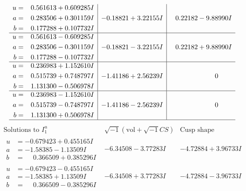 \documentclass[1p]{elsarticle_modified}
\theoremstyle{definition}
\newcommand{\I}{\sqrt{-1}}
\begin{document}
$$\begin{array}{c|c|c}
\begin{aligned}
u &= \phantom{-}0.561613 + 0.609285 I \\
a &= \phantom{-}0.283506 + 0.301159 I \\
b &= \phantom{-}0.177288 + 0.107732 I\end{aligned}
 & -0.18821 + 3.22155 I & \phantom{-}0.22182 - 9.88990 I \\ \hline\begin{aligned}
u &= \phantom{-}0.561613 - 0.609285 I \\
a &= \phantom{-}0.283506 - 0.301159 I \\
b &= \phantom{-}0.177288 - 0.107732 I\end{aligned}
 & -0.18821 - 3.22155 I & \phantom{-}0.22182 + 9.88990 I \\ \hline\begin{aligned}
u &= \phantom{-}0.236983 + 1.152610 I \\
a &= \phantom{-}0.515739 + 0.748797 I \\
b &= \phantom{-}1.131300 - 0.506978 I\end{aligned}
 & -1.41186 + 2.56239 I & \phantom{-0.000000 } 0 \\ \hline\begin{aligned}
u &= \phantom{-}0.236983 - 1.152610 I \\
a &= \phantom{-}0.515739 - 0.748797 I \\
b &= \phantom{-}1.131300 + 0.506978 I\end{aligned}
 & -1.41186 - 2.56239 I & \phantom{-0.000000 } 0\\
 \hline 
 \end{array}$$\newpage$$\begin{array}{c|c|c}  
\text{Solutions to }I^u_{1}& \I (\text{vol} + \sqrt{-1}CS) & \text{Cusp shape}\\
 \hline 
\begin{aligned}
u &= -0.679423 + 0.455165 I \\
a &= -1.58385 - 1.13509 I \\
b &= \phantom{-}0.366509 + 0.385296 I\end{aligned}
 & -6.34508 - 3.77283 I & -4.72884 + 3.96733 I \\ \hline\begin{aligned}
u &= -0.679423 - 0.455165 I \\
a &= -1.58385 + 1.13509 I \\
b &= \phantom{-}0.366509 - 0.385296 I\end{aligned}
 & -6.34508 + 3.77283 I & -4.72884 - 3.96733 I \\ \hline\begin{aligned}

\end{aligned}
\end{array}$$
\end{document}
